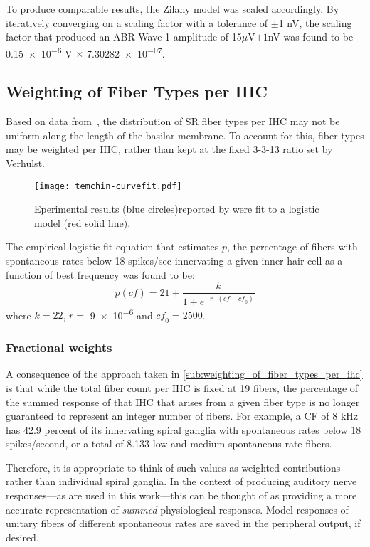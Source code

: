 To produce comparable results, the Zilany model was scaled accordingly. By iteratively converging on a scaling factor with a tolerance of $\pm$1 nV, the scaling factor that produced an ABR Wave-1 amplitude of 15$\mu$V$\pm 1$nV was found to be \num{0.15e-6} V $\times$ \num{7.30282e-07}.


\subsection{Weighting of Fiber Types per IHC} %
\label{sub:weighting_of_fiber_types_per_ihc}
Based on data from~\cite{Temchin2008Threshold}, the distribution of SR fiber types per IHC may not be uniform along the length of the basilar membrane.  To account for this, fiber types may be weighted per IHC, rather than kept at the fixed 3-3-13 ratio set by Verhulst.  
\begin{figure}[htbp]
	\centering
	\texttt{[image: temchin-curvefit.pdf]}
	\caption[Variation in Spontaneous Rate as a function of frequency]{Eperimental results (blue circles)reported by \citeauthor{Temchin2008Threshold} were fit to a logistic model (red solid line).}
	\label{fig:temchin-curvefit}
\end{figure}

The empirical logistic fit equation that estimates $p$, the percentage of fibers with spontaneous rates below 18 spikes/sec innervating a given inner hair cell as a function of best frequency was found to be: 
\begin{equation}
p(\mathit{cf}) = 21 + \frac{k}{1+e^{-r\cdot(\mathit{cf}-\mathit{cf}_0)}}
\end{equation}
where $k = 22$, $r = $ \num{9e-6} and $\mathit{cf}_0 = 2500$.
\subsubsection{Fractional weights}
A consequence of the approach taken in \autoref{sub:weighting_of_fiber_types_per_ihc} is that while the total fiber count per IHC is fixed at 19 fibers, the percentage of the summed response of that IHC that arises from a given fiber type is no longer guaranteed to represent an integer number of fibers.  For example, a CF of 8 kHz has 42.9 percent of its innervating spiral ganglia with spontaneous rates below 18 spikes/second, or a total of 8.133 low and medium spontaneous rate fibers.  

Therefore, it is appropriate to think of such values as weighted contributions rather than individual spiral ganglia.  In the context of producing auditory nerve responses---as are used in this work---this can be thought of as providing a more accurate representation of \emph{summed} physiological responses. Model responses of unitary fibers of different spontaneous rates are saved in the peripheral output, if desired.

